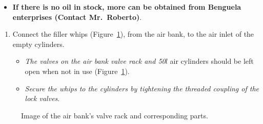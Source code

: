 \documentclass[
  12pt,
]{report}
\providecommand{\tightlist}{%
  \setlength{\itemsep}{0pt}\setlength{\parskip}{0pt}}\usepackage{longtable,booktabs,array}
\begin{document}
\begin{itemize}
\tightlist
\item
  \textbf{If there is no oil in stock, more can be obtained from
  Benguela enterprises (Contact Mr.~Roberto)}.
\end{itemize}

\begin{enumerate}
\def\labelenumi{\arabic{enumi}.}
\setcounter{enumi}{2}
\tightlist
\item
  Connect the filler whips (Figure~\ref{fig-bankrack}), from the air
  bank, to the air inlet of the empty cylinders.

  \begin{itemize}
  \tightlist
  \item
    \emph{The valves on the air bank valve rack and 50}\(l\) air
    cylinders should be left open when not in use
    (Figure~\ref{fig-bankrack}).
  \item
    \emph{Secure the whips to the cylinders by tightening the threaded
    coupling of the lock valves}.
  \end{itemize}
\end{enumerate}

\begin{figure}[H]

\begin{minipage}[t]{0.33\linewidth}

{\centering 


}

\end{minipage}%
%
\begin{minipage}[t]{0.33\linewidth}

{\centering 


}

\end{minipage}%
%
\begin{minipage}[t]{0.33\linewidth}

{\centering 


}

\end{minipage}%

\caption{\label{fig-bankrack}Image of the air bank's valve rack and
corresponding parts.}

\end{figure}
\end{document}
